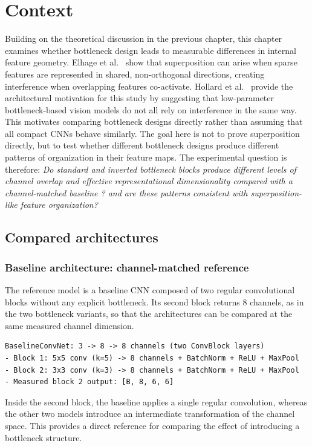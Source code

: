 \documentclass[12pt,a4paper]{report}
\begin{document}
\section{Context}
Building on the theoretical discussion in the previous chapter, this chapter examines whether bottleneck design leads to measurable differences in internal feature geometry. Elhage et al.~\cite{elhage2022} show that superposition can arise when sparse features are represented in shared, non-orthogonal directions, creating interference when overlapping features co-activate. Hollard et al.~\cite{hollard2025} provide the architectural motivation for this study by suggesting that low-parameter bottleneck-based vision models do not all rely on interference in the same way. This motivates comparing bottleneck designs directly rather than assuming that all compact CNNs behave similarly. The goal here is not to prove superposition directly, but to test whether different bottleneck designs produce different patterns of organization in their feature maps. The experimental question is therefore: \textit{Do standard and inverted bottleneck blocks produce different levels of channel overlap and effective representational dimensionality compared with a channel-matched baseline ? and are these patterns consistent with superposition-like feature organization?}

\subsection{Compared architectures}

\subsubsection{Baseline architecture: channel-matched reference}
The reference model is a baseline CNN composed of two regular convolutional blocks without any explicit bottleneck. Its second block returns 8 channels, as in the two bottleneck variants, so that the architectures can be compared at the same measured channel dimension.

\begin{verbatim}
BaselineConvNet: 3 -> 8 -> 8 channels (two ConvBlock layers)
- Block 1: 5x5 conv (k=5) -> 8 channels + BatchNorm + ReLU + MaxPool
- Block 2: 3x3 conv (k=3) -> 8 channels + BatchNorm + ReLU + MaxPool
- Measured block 2 output: [B, 8, 6, 6]
\end{verbatim}

Inside the second block, the baseline applies a single regular convolution, whereas the other two models introduce an intermediate transformation of the channel space. This provides a direct reference for comparing the effect of introducing a bottleneck structure.
\end{document}
